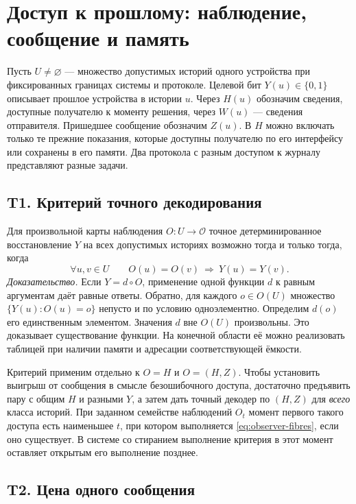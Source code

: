 \section{Доступ к прошлому: наблюдение, сообщение и память}
\label{sec:observer-theory}

Пусть $U\ne\varnothing$ --- множество допустимых историй одного устройства при
фиксированных границах системы и протоколе. Целевой бит $Y(u)\in\{0,1\}$
описывает прошлое устройства в истории $u$. Через $H(u)$ обозначим сведения,
доступные получателю к моменту решения, через $W(u)$ --- сведения отправителя.
Пришедшее сообщение обозначим $Z(u)$. В $H$ можно включать только те прежние
показания, которые доступны получателю по его интерфейсу или сохранены в его
памяти. Два протокола с разным доступом к журналу представляют разные задачи.

\subsection{T1. Критерий точного декодирования}
\label{thm:observer-t1}

Для произвольной карты наблюдения $O:U\to\mathcal O$ точное детерминированное
восстановление $Y$ на всех допустимых историях возможно тогда и только тогда,
когда
\begin{equation}
 \forall u,v\in U\qquad O(u)=O(v)\ \Longrightarrow\ Y(u)=Y(v).
 \label{eq:observer-fibres}
\end{equation}
\emph{Доказательство.} Если $Y=d\circ O$, применение одной функции $d$ к равным
аргументам даёт равные ответы. Обратно, для каждого $o\in O(U)$ множество
$\{Y(u):O(u)=o\}$ непусто и по условию одноэлементно. Определим $d(o)$ его
единственным элементом. Значения $d$ вне $O(U)$ произвольны. Это доказывает
существование функции. На конечной области её можно реализовать таблицей при
наличии памяти и адресации соответствующей ёмкости.

Критерий применим отдельно к $O=H$ и $O=(H,Z)$. Чтобы установить выигрыш от
сообщения в смысле безошибочного доступа, достаточно предъявить пару с общим
$H$ и разными $Y$, а затем дать точный декодер по $(H,Z)$ для \emph{всего}
класса историй. При заданном семействе наблюдений $O_t$ момент первого такого
доступа есть наименьшее $t$, при котором выполняется
\eqref{eq:observer-fibres}, если оно существует. В системе со стиранием
выполнение критерия в этот момент оставляет открытым его выполнение позднее.

\subsection{T2. Цена одного сообщения}
\label{thm:observer-t2}

